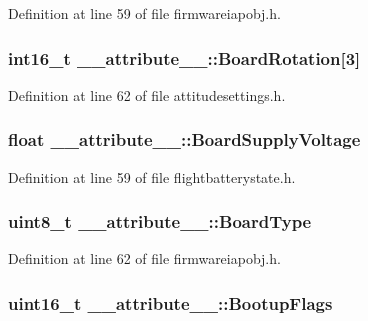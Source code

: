 \-Definition at line 59 of file firmwareiapobj.\-h.

\hypertarget{struct____attribute_____a5147508dbc9acee939608efdf4581d55}{
\subsubsection[{\-Board\-Rotation}]{\setlength{\rightskip}{0pt plus 5cm}int16\-\_\-t {\bf \-\_\-\-\_\-attribute\-\_\-\-\_\-\-::\-Board\-Rotation}\mbox{[}3\mbox{]}}}\label{struct____attribute_____a5147508dbc9acee939608efdf4581d55}


\-Definition at line 62 of file attitudesettings.\-h.

\hypertarget{struct____attribute_____a1f3528a983ecc15aa2e897c31d350162}{
\subsubsection[{\-Board\-Supply\-Voltage}]{\setlength{\rightskip}{0pt plus 5cm}float {\bf \-\_\-\-\_\-attribute\-\_\-\-\_\-\-::\-Board\-Supply\-Voltage}}}\label{struct____attribute_____a1f3528a983ecc15aa2e897c31d350162}


\-Definition at line 59 of file flightbatterystate.\-h.

\hypertarget{struct____attribute_____aa1c2b455eb4cbdda923ac671d58a9335}{
\subsubsection[{\-Board\-Type}]{\setlength{\rightskip}{0pt plus 5cm}uint8\-\_\-t {\bf \-\_\-\-\_\-attribute\-\_\-\-\_\-\-::\-Board\-Type}}}\label{struct____attribute_____aa1c2b455eb4cbdda923ac671d58a9335}


\-Definition at line 62 of file firmwareiapobj.\-h.

\hypertarget{struct____attribute_____a49d1685ee043a9bb4a84efe65c7d02a5}{
\subsubsection[{\-Bootup\-Flags}]{\setlength{\rightskip}{0pt plus 5cm}uint16\-\_\-t {\bf \-\_\-\-\_\-attribute\-\_\-\-\_\-\-::\-Bootup\-Flags}}}\label{struct____attribute_____a49d1685ee043a9bb4a84efe65c7d02a5}


